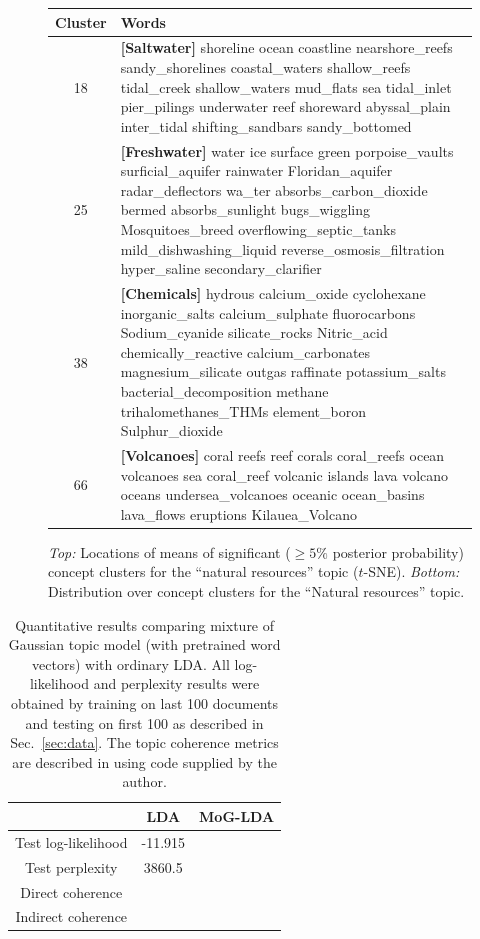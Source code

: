 \documentclass[11pt]{article}
\begin{document}
\begin{figure}
\begin{tabularx}{\columnwidth}{|c|X|}
\hline 
{\tiny{}Cluster} & {\tiny{}Words}\tabularnewline
\hline 
{\tiny{}18} & {\tiny{}\textbf{[Saltwater]} shoreline ocean coastline nearshore\_reefs sandy\_shorelines
coastal\_waters shallow\_reefs tidal\_creek shallow\_waters mud\_flats
sea tidal\_inlet pier\_pilings underwater reef shoreward abyssal\_plain
inter\_tidal shifting\_sandbars sandy\_bottomed }\tabularnewline
\hline 
{\tiny{}25} & {\tiny{}\textbf{[Freshwater]} water ice surface green porpoise\_vaults surficial\_aquifer
rainwater Floridan\_aquifer radar\_deflectors wa\_ter absorbs\_carbon\_dioxide
bermed absorbs\_sunlight bugs\_wiggling Mosquitoes\_breed overflowing\_septic\_tanks
mild\_dishwashing\_liquid reverse\_osmosis\_filtration hyper\_saline
secondary\_clarifier }\tabularnewline
\hline 
{\tiny{}38} & {\tiny{}\textbf{[Chemicals]} hydrous calcium\_oxide cyclohexane inorganic\_salts calcium\_sulphate
fluorocarbons Sodium\_cyanide silicate\_rocks Nitric\_acid chemically\_reactive
calcium\_carbonates magnesium\_silicate outgas raffinate potassium\_salts
bacterial\_decomposition methane trihalomethanes\_THMs element\_boron
Sulphur\_dioxide }\tabularnewline
\hline 
{\tiny{}66} & {\tiny{}\textbf{[Volcanoes]} coral reefs reef corals coral\_reefs ocean volcanoes sea coral\_reef
volcanic islands lava volcano oceans undersea\_volcanoes oceanic ocean\_basins
lava\_flows eruptions Kilauea\_Volcano}\tabularnewline
\hline 
\end{tabularx}

\caption{\emph{Top:} Locations of means of significant ($\geq 5\%$ posterior probability) concept clusters for the ``natural resources'' topic ($t$-SNE). \emph{Bottom:} Distribution over concept clusters for the ``Natural resources'' topic.}
\end{figure}

\begin{table}
\centering
\begin{tabular}{|c|c|c|}
\cline{2-3} 
\multicolumn{1}{c|}{} & LDA & MoG-LDA\tabularnewline
\hline 
Test log-likelihood & -11.915 & \tabularnewline
\hline 
Test perplexity & 3860.5 & \tabularnewline
\hline 
Direct coherence &  & \tabularnewline
\hline 
Indirect coherence &  & \tabularnewline
\hline 
\end{tabular}
\caption{Quantitative results comparing mixture of Gaussian topic model (with pretrained word vectors) with ordinary LDA. All log-likelihood and perplexity results were obtained by training on last 100 documents and testing on first 100 as described in Sec.~\ref{sec:data}. The topic coherence metrics are described in \cite{Lau14} using code supplied by the author.}
\end{table}
\end{document}

